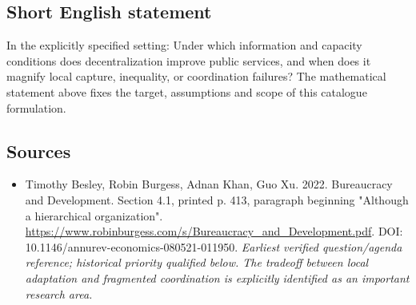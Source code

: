 \documentclass[11pt]{article}
\begin{document}
\subsection{Short English statement}
In the explicitly specified setting: Under which information and capacity conditions does decentralization improve public services, and when does it magnify local capture, inequality, or coordination failures? The mathematical statement above fixes the target, assumptions and scope of this catalogue formulation.

\subsection{Sources}
\begin{itemize}\raggedright
\item[\textnormal{[S1]}]\hypertarget{source:30007668:1}{} Timothy Besley, Robin Burgess, Adnan Khan, Guo Xu. 2022. Bureaucracy and Development. Section 4.1, printed p. 413, paragraph beginning "Although a hierarchical organization".
\url{https://www.robinburgess.com/s/Bureaucracy_and_Development.pdf}.
DOI: 10.1146/annurev-economics-080521-011950.
{\small\textit{Earliest verified question/agenda reference; historical priority qualified below. The tradeoff between local adaptation and fragmented coordination is explicitly identified as an important research area.}}
\end{itemize}
\end{document}
